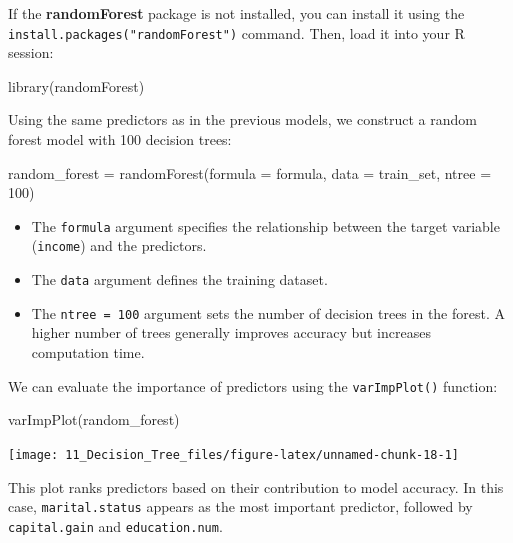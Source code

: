 \documentclass[
  11pt,
]{book}
\makeatletter
\newenvironment{Shaded}{}{}
\newcommand{\AttributeTok}[1]{#1}
\newcommand{\DecValTok}[1]{#1}
\newcommand{\FunctionTok}[1]{#1}
\newcommand{\NormalTok}[1]{#1}
\newcommand{\OtherTok}[1]{\textcolor[rgb]{0.39,0.39,0.39}{#1}}
\providecommand{\tightlist}{%
  \setlength{\itemsep}{0pt}\setlength{\parskip}{0pt}}
\newenvironment{kframe}{%
\medskip{}
\setlength{\fboxsep}{.8em}
 \def\at@end@of@kframe{}%
 \ifinner\ifhmode%
  \def\at@end@of@kframe{\end{minipage}}%
  \begin{minipage}{\columnwidth}%
 \fi\fi%
 \def\FrameCommand##1{\hskip\@totalleftmargin \hskip-\fboxsep
 \colorbox{shadecolor}{##1}\hskip-\fboxsep
     \hskip-\linewidth \hskip-\@totalleftmargin \hskip\columnwidth}%
 \MakeFramed {\advance\hsize-\width
   \@totalleftmargin\z@ \linewidth\hsize
   \@setminipage}}%
 {\par\unskip\endMakeFramed%
 \at@end@of@kframe}
\renewenvironment{Shaded}{\begin{kframe}}{\end{kframe}}
\theoremstyle{definition}
\theoremstyle{definition}
\theoremstyle{definition}
\theoremstyle{definition}
\theoremstyle{remark}
\makeatother
\begin{document}
If the \textbf{randomForest} package is not installed, you can install it using the \texttt{install.packages("randomForest")} command. Then, load it into your R session:

\begin{Shaded}
\begin{Highlighting}[]
\FunctionTok{library}\NormalTok{(randomForest)}
\end{Highlighting}
\end{Shaded}

Using the same predictors as in the previous models, we construct a random forest model with 100 decision trees:

\begin{Shaded}
\begin{Highlighting}[]
\NormalTok{random\_forest }\OtherTok{=} \FunctionTok{randomForest}\NormalTok{(}\AttributeTok{formula =}\NormalTok{ formula, }\AttributeTok{data =}\NormalTok{ train\_set, }\AttributeTok{ntree =} \DecValTok{100}\NormalTok{)}
\end{Highlighting}
\end{Shaded}

\begin{itemize}
\tightlist
\item
  The \texttt{formula} argument specifies the relationship between the target variable (\texttt{income}) and the predictors.\\
\item
  The \texttt{data} argument defines the training dataset.\\
\item
  The \texttt{ntree\ =\ 100} argument sets the number of decision trees in the forest. A higher number of trees generally improves accuracy but increases computation time.
\end{itemize}

We can evaluate the importance of predictors using the \texttt{varImpPlot()} function:

\begin{Shaded}
\begin{Highlighting}[]
\FunctionTok{varImpPlot}\NormalTok{(random\_forest)}
\end{Highlighting}
\end{Shaded}

\begin{center}\texttt{[image: 11\_Decision\_Tree\_files/figure-latex/unnamed-chunk-18-1]} \end{center}

This plot ranks predictors based on their contribution to model accuracy. In this case, \texttt{marital.status} appears as the most important predictor, followed by \texttt{capital.gain} and \texttt{education.num}.
\end{document}
